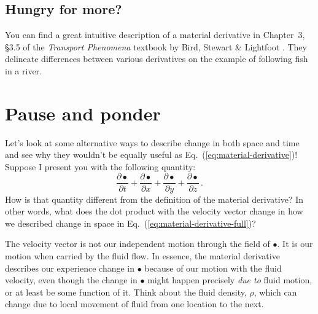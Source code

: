 \vfill

\newpage


\begin{mdframed}[style=exercise-frame]

\subsection*{Hungry for more?}

You can find a great intuitive description of a material derivative in Chapter~3, \S3.5 of the \textit{Transport Phenomena} textbook by Bird, Stewart \& Lightfoot \cite{bird2002transport}. They delineate differences between various derivatives on the example of following fish in a river.

\end{mdframed}

\section{Pause and ponder}

Let's look at some alternative ways to describe change in both space and time and see why they wouldn't be equally useful as Eq.~(\ref{eq:material-derivative})! Suppose I present you with the following quantity:
\begin{equation} \label{eq:all-derivatives}
\frac{\partial \bullet}{\partial t} + \frac{\partial \bullet}{\partial x} + \frac{\partial \bullet}{\partial y} + \frac{\partial \bullet}{\partial z} \, .
\end{equation}
How is that quantity different from the definition of the material derivative? In other words, what does the dot product with the velocity vector change in how we described change in space in Eq.~(\ref{eq:material-derivative-full})?



The velocity vector is not our independent motion through the field of $\bullet$. It is our motion when carried by the fluid flow. In essence, the material derivative describes our experience change in $\bullet$ because of our motion with the fluid velocity, even though the change in $\bullet$ might happen precisely \textit{due to} fluid motion, or at least be some function of it. Think about the fluid density, $\rho$, which can change due to local movement of fluid from one location to the next.


